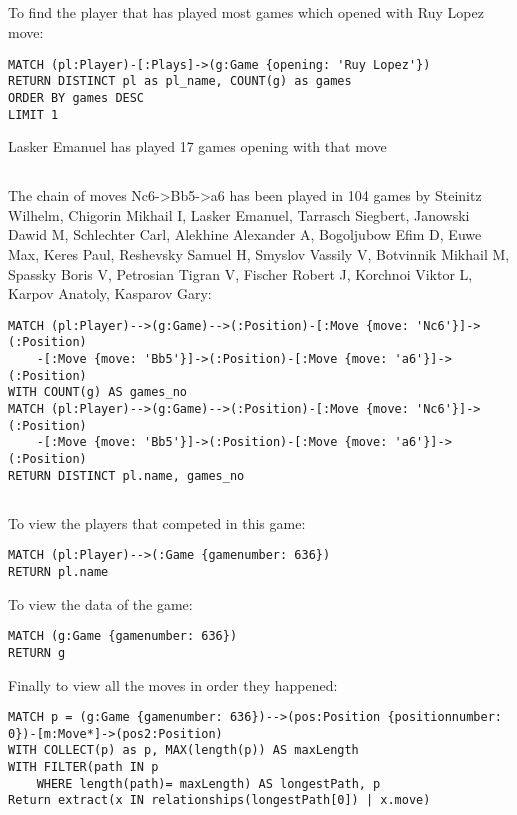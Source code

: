 \documentclass{article}
\begin{document}
\subsection{}
To find the player that has played most games which opened with Ruy Lopez move:
\begin{lstlisting}
MATCH (pl:Player)-[:Plays]->(g:Game {opening: 'Ruy Lopez'})
RETURN DISTINCT pl as pl_name, COUNT(g) as games
ORDER BY games DESC
LIMIT 1
\end{lstlisting}
Lasker Emanuel has played 17 games opening with that move

\subsection{}
The chain of moves Nc6->Bb5->a6 has been played in 104 games by Steinitz 
Wilhelm, Chigorin  Mikhail I, Lasker  Emanuel, Tarrasch  Siegbert, Janowski 
Dawid M, Schlechter  Carl, Alekhine  Alexander A, Bogoljubow  Efim D, Euwe  Max,
Keres  Paul, Reshevsky  Samuel H, Smyslov  Vassily V, Botvinnik  Mikhail M,
Spassky  Boris V, Petrosian  Tigran V, Fischer  Robert J, Korchnoi  Viktor L,
Karpov  Anatoly, Kasparov  Gary:
\begin{lstlisting}
MATCH (pl:Player)-->(g:Game)-->(:Position)-[:Move {move: 'Nc6'}]->(:Position)
	-[:Move {move: 'Bb5'}]->(:Position)-[:Move {move: 'a6'}]->(:Position)
WITH COUNT(g) AS games_no
MATCH (pl:Player)-->(g:Game)-->(:Position)-[:Move {move: 'Nc6'}]->(:Position)
	-[:Move {move: 'Bb5'}]->(:Position)-[:Move {move: 'a6'}]->(:Position)
RETURN DISTINCT pl.name, games_no
\end{lstlisting}

\subsection{}
To view the players that competed in this game:
\begin{lstlisting}
MATCH (pl:Player)-->(:Game {gamenumber: 636})
RETURN pl.name
\end{lstlisting}

To view the data of the game:
\begin{lstlisting}
MATCH (g:Game {gamenumber: 636})
RETURN g
\end{lstlisting}

Finally to view all the moves in order they happened:
\begin{lstlisting}
MATCH p = (g:Game {gamenumber: 636})-->(pos:Position {positionnumber: 0})-[m:Move*]->(pos2:Position)
WITH COLLECT(p) as p, MAX(length(p)) AS maxLength
WITH FILTER(path IN p
	WHERE length(path)= maxLength) AS longestPath, p
Return extract(x IN relationships(longestPath[0]) | x.move)
\end{lstlisting}

\subsection{}
\end{document}
